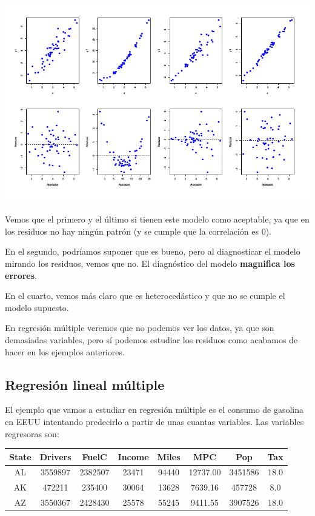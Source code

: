 \begin{itemize}
\begin{example}
\begin{center}
\includegraphics[scale=0.5]{img/diagmodelo_2.png}
\end{center}

Vemos que el primero y el último si tienen este modelo como aceptable, ya que en los residuos no hay ningún patrón (y se cumple que la correlación es 0).

En el segundo, podríamos suponer que es bueno, pero al diagnosticar el modelo mirando los residuos, vemos que no. El diagnóstico del modelo \textbf{magnifica los errores}.

En el cuarto, vemos más claro que es heterocedástico y que no se cumple el modelo supuesto.
\end{example}

En regresión múltiple veremos que no podemos ver los datos, ya que son demasiadas variables, pero sí podemos estudiar los residuos como acabamos de hacer en los ejemplos anteriores.


\subsection{Regresión lineal múltiple}

El ejemplo que vamos a estudiar en regresión múltiple es el consumo de gasolina en EEUU intentando predecirlo a partir de unas cuantas variables. Las variables regresoras son:

\begin{center}
\begin{tabular}{cccccccc}
State&Drivers&FuelC&Income&Miles&MPC&Pop&Tax\\\hline
AL&3559897&2382507&23471&94440&12737.00&3451586&18.0\\
AK&472211&235400&30064&13628&7639.16&457728&8.0\\
AZ&3550367&2428430&25578&55245&9411.55&3907526&18.0
\end{tabular}
\end{center}


\end{itemize}
